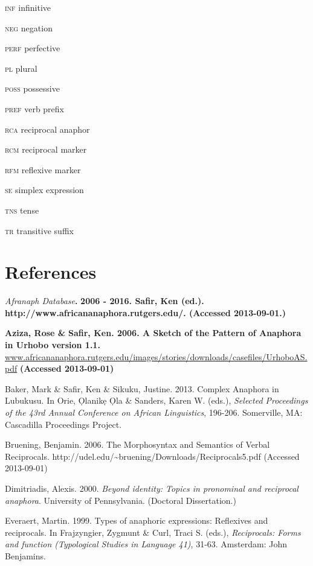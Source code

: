 \documentclass[output=paper]{langsci/langscibook}
\begin{document}
\textsc{inf}    infinitive

\textsc{neg}    negation

\textsc{perf    }perfective

\textsc{pl}    plural

\textsc{poss}    possessive

\textsc{pref    }verb prefix

\textsc{rca    }reciprocal anaphor

\textsc{rcm}    reciprocal marker

\textsc{rfm}    reflexive marker

\textsc{se}    simplex expression  

\textsc{tns}    tense

\textsc{tr    }transitive suffix

\chapter{References}

\emph{\textup{Afranaph Database}}\textbf{\textmd{. }}\textbf{2006 - 2016. Safir, Ken (ed.). http://www.africananaphora.rutgers.edu/. (Accessed 2013-09-01.)}

\textbf{\textmd{Aziza, Rose \& }}\textbf{ Safir, Ken. 2006. A Sketch of the Pattern of Anaphora in Urhobo version 1.1. }\href{http://www.africananaphora.rutgers.edu/images/stories/downloads/casefiles/UrhoboAS.pdf}{{www.africananaphora.rutgers.edu/images/stories/downloads/casefiles/UrhoboAS.pdf}}\textbf{ (Accessed 2013-09-01)}

Baker, Mark \& Safir, Ken \& Sikuku, Justine. 2013. Complex Anaphora in Lubukusu. In Orie, Ọlanikẹ Ọla \& Sanders, Karen W. (eds.), \textit{Selected Proceedings of the 43rd Annual Conference on African Linguistics}, 196-206. Somerville, MA: Cascadilla Proceedings Project.

Bruening, Benjamin. 2006. The Morphosyntax and Semantics of Verbal Reciprocals. http://udel.edu/{\textasciitilde}bruening/Downloads/Reciprocals5.pdf (Accessed 2013-09-01)

\begin{styleWWDefault}
Dimitriadis, Alexis. 2000. \textit{Beyond identity: Topics in pronominal and reciprocal anaphora}. University of Pennsylvania. (Doctoral Dissertation.)
\end{styleWWDefault}

Everaert, Martin. 1999. Types of anaphoric expressions: Reflexives and reciprocals. In Frajzyngier, Zygmunt \& Curl, Traci S. (eds.), \textit{Reciprocals: Forms and function (Typological Studies in Language 41)},\textit{ }31-63. Amsterdam: John Benjamins.
\end{document}
